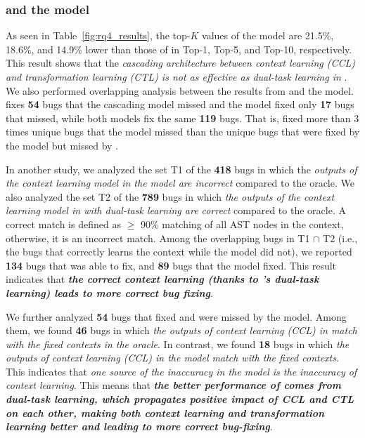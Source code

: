 
\subsubsection{{\bf {\tool} and the  model}}

As seen in Table~\ref{fig:rq4_results}, the top-$K$ values of the
 model are 21.5\%, 18.6\%, and 14.9\% lower than those
of {\tool} in Top-1, Top-5, and Top-10, respectively. This result
shows that the {\em cascading architecture between context learning
  (CCL) and transformation learning (CTL) is not as effective as
  dual-task learning in {\tool}}.
%
We also performed overlapping analysis between the results from
{\tool} and the  model. {\tool} fixes {\bf 54} bugs
that the cascading model missed and the  model fixed
only {\bf 17} bugs that {\tool} missed, while both models fix the same
{\bf 119} bugs. That is, {\tool} fixed more than 3 times unique bugs
that the  model missed than the unique bugs that were
fixed by the  model but missed by {\tool}.




In another study, we analyzed the set T1 of the {\bf 418} bugs in which
the {\em outputs of the context learning model in the 
  model are incorrect} compared to the oracle. We also analyzed the
set T2 of the {\bf 789} bugs in which {\em the outputs of the context
  learning model in {\tool} with dual-task learning are correct}
compared to the oracle. A correct match is defined as $\geq$ 90\%
matching of all AST nodes in the context, otherwise, it is an
incorrect match. Among the overlapping bugs in T1 $\cap$ T2 (i.e., the
bugs that {\tool} correctly learns the context while the
 model did not), we reported {\bf 134} bugs that
     {\tool} was able to fix, and {\bf 89} bugs that the
      model fixed.  This result indicates that {\bf {\em
       the correct context learning (thanks to {\tool}'s dual-task
       learning) leads to more correct bug fixing}}.

We further analyzed {\bf 54} bugs that {\tool} fixed and were missed
by the  model. Among them, we found {\bf 46} bugs in
which {\em the outputs of context learning (CCL) in {\tool} match with
  the fixed contexts in the oracle}. In contrast, we found {\bf 18}
bugs in which {\em the outputs of context learning (CCL) in the
   model match with the fixed contexts}. This
indicates that {\em one source of the inaccuracy in the
   model is the inaccuracy of context learning}. This
means that {\bf {\em the better performance of {\tool} comes from
    dual-task learning, which propagates positive impact of CCL and
    CTL on each other, making both context learning and transformation
    learning better and leading to more correct bug-fixing}}.

